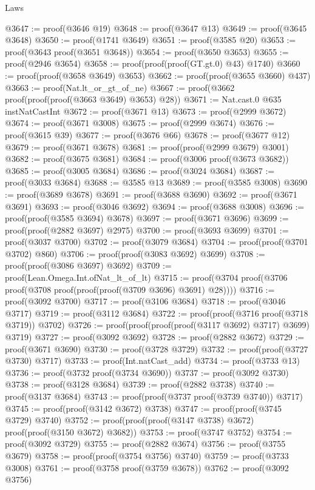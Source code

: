 \begin{lexlean}{Laws}
\begin{coremodule}
@3647 := proof(@3646 @19)
@3648 := proof(@3647 @13)
@3649 := proof(@3645 @3648)
@3650 := proof(@1741 @3649)
@3651 := proof(@3585 @20)
@3653 := proof(@3643 proof(@3651 @3648))
@3654 := proof(@3650 @3653)
@3655 := proof(@2946 @3654)
@3658 := proof(proof(proof(GT.gt.{0}) @43) @1740)
@3660 := proof(proof(@3658 @3649) @3653)
@3662 := proof(proof(@3655 @3660) @437)
@3663 := proof(Nat.lt_or_gt_of_ne)
@3667 := proof(@3662 proof(proof(proof(@3663 @3649) @3653) @28))
@3671 := Nat.cast.{0} @635 instNatCastInt
@3672 := proof(@3671 @13)
@3673 := proof(@2999 @3672)
@3674 := proof(@3671 @3008)
@3675 := proof(@2999 @3674)
@3676 := proof(@3615 @39)
@3677 := proof(@3676 @66)
@3678 := proof(@3677 @12)
@3679 := proof(@3671 @3678)
@3681 := proof(proof(@2999 @3679) @3001)
@3682 := proof(@3675 @3681)
@3684 := proof(@3006 proof(@3673 @3682))
@3685 := proof(@3005 @3684)
@3686 := proof(@3024 @3684)
@3687 := proof(@3033 @3684)
@3688 := @3585 @13
@3689 := proof(@3585 @3008)
@3690 := proof(@3689 @3678)
@3691 := proof(@3688 @3690)
@3692 := proof(@3671 @3691)
@3693 := proof(@3046 @3692)
@3694 := proof(@3688 @3008)
@3696 := proof(proof(@3585 @3694) @3678)
@3697 := proof(@3671 @3696)
@3699 := proof(proof(@2882 @3697) @2975)
@3700 := proof(@3693 @3699)
@3701 := proof(@3037 @3700)
@3702 := proof(@3079 @3684)
@3704 := proof(proof(@3701 @3702) @860)
@3706 := proof(proof(@3083 @3692) @3699)
@3708 := proof(proof(@3086 @3697) @3692)
@3709 := proof(Lean.Omega.Int.ofNat_lt_of_lt)
@3715 := proof(@3704 proof(@3706 proof(@3708 proof(proof(proof(@3709 @3696) @3691) @28))))
@3716 := proof(@3092 @3700)
@3717 := proof(@3106 @3684)
@3718 := proof(@3046 @3717)
@3719 := proof(@3112 @3684)
@3722 := proof(proof(@3716 proof(@3718 @3719)) @3702)
@3726 := proof(proof(proof(proof(@3117 @3692) @3717) @3699) @3719)
@3727 := proof(@3092 @3692)
@3728 := proof(@2882 @3672)
@3729 := proof(@3671 @3690)
@3730 := proof(@3728 @3729)
@3732 := proof(proof(@3727 @3730) @3717)
@3733 := proof(Int.natCast_add)
@3734 := proof(@3733 @13)
@3736 := proof(@3732 proof(@3734 @3690))
@3737 := proof(@3092 @3730)
@3738 := proof(@3128 @3684)
@3739 := proof(@2882 @3738)
@3740 := proof(@3137 @3684)
@3743 := proof(proof(@3737 proof(@3739 @3740)) @3717)
@3745 := proof(proof(@3142 @3672) @3738)
@3747 := proof(proof(@3745 @3729) @3740)
@3752 := proof(proof(proof(@3147 @3738) @3672) proof(proof(@3150 @3672) @3682))
@3753 := proof(@3747 @3752)
@3754 := proof(@3092 @3729)
@3755 := proof(@2882 @3674)
@3756 := proof(@3755 @3679)
@3758 := proof(proof(@3754 @3756) @3740)
@3759 := proof(@3733 @3008)
@3761 := proof(@3758 proof(@3759 @3678))
@3762 := proof(@3092 @3756)

\end{coremodule}
\end{lexlean}
